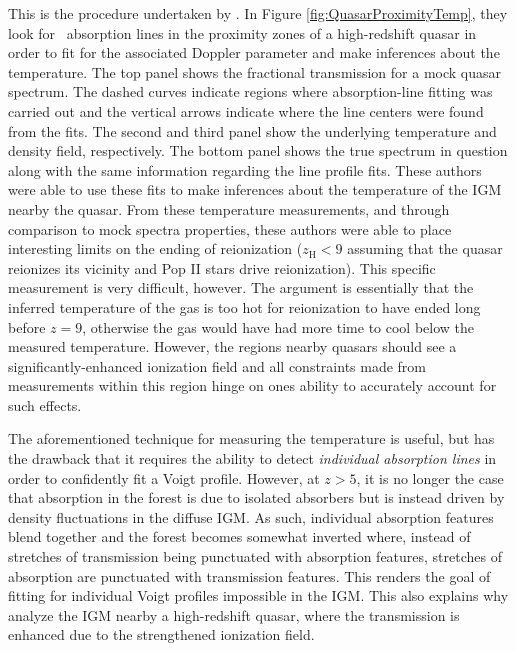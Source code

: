 This is the procedure undertaken by \citet{BoltonQuasar}. In Figure \ref{fig:QuasarProximityTemp}, they look for \lya\ absorption lines in the proximity zones of a high-redshift quasar in order to fit for the associated Doppler parameter and make inferences about the temperature. The top panel shows the fractional transmission for a mock quasar spectrum. The dashed curves indicate regions where absorption-line fitting was carried out and the vertical arrows indicate where the line centers were found from the fits. The second and third panel show the underlying temperature and density field, respectively. The bottom panel shows the true spectrum in question along with the same information regarding the line profile fits. These authors were able to use these fits to make inferences about the temperature of the IGM nearby the quasar. From these temperature measurements, and through comparison to mock spectra properties, these authors were able to place interesting limits on the ending of reionization ($z_{\text{H}} <  9$ assuming that the quasar reionizes its vicinity and Pop II stars drive reionization). This specific measurement is very difficult, however. The argument is essentially that the inferred temperature of the gas is too hot for reionization to have ended long before $z = 9$, otherwise the gas would have had more time to cool below the measured temperature. However, the regions nearby quasars should see a significantly-enhanced ionization field and all constraints made from measurements within this region hinge on ones ability to accurately account for such effects. 


The aforementioned technique for measuring the temperature is useful, but has the drawback that it requires the ability to detect \textit{individual absorption lines} in order to confidently fit a Voigt profile. However, at $z > 5$, it is no longer the case that absorption in the forest is due to isolated absorbers but is instead driven by density fluctuations in the diffuse IGM. As such, individual absorption features blend together and the forest becomes somewhat inverted where, instead of stretches of transmission being punctuated with absorption features, stretches of absorption are punctuated with transmission features. This renders the goal of fitting for individual Voigt profiles impossible in the IGM. This also explains why \citet{BoltonQuasar} analyze the IGM  nearby a high-redshift quasar, where the transmission is enhanced due to the strengthened ionization field. 


